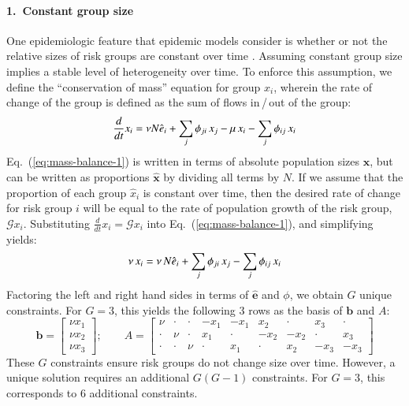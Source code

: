 \paragraph{1.~Constant group size}
\label{con:const-group}
One epidemiologic feature that epidemic models consider
is whether or not the relative sizes of risk groups are constant over time
\citep{Henry2015,Boily2015}.
Assuming constant group size implies a stable level of heterogeneity over time.
To enforce this assumption,
we define the ``conservation of mass'' equation for group $x_i$,
wherein the rate of change of the group
is defined as the sum of flows in\,/\,out of the group:
\begin{equation}\label{eq:mass-balance-1}
\frac{d}{dt}x_i
= \nu N \hat{e}_i + \sum_{j}{\phi_{ji} \thinspace x_j}
- \mu \thinspace x_i - \sum_{j}{\phi_{ij} \thinspace x_i}
\end{equation}
Eq.~(\ref{eq:mass-balance-1}) is written in terms of
absolute population sizes $\bm{x}$,
but can be written as proportions $\bm{\hat{x}}$
by dividing all terms by $N$.
If we assume that the proportion of each group $\hat{x}_i$ is constant over time,
then the desired rate of change for risk group $i$
will be equal to the rate of population growth of the risk group, $\mathcal{G} x_i$.
Substituting $\frac{d}{dt}x_i = \mathcal{G} x_i$
into Eq.~(\ref{eq:mass-balance-1}),
and simplifying yields:
\begin{equation}\label{eq:mass-balance-2}
\nu \thinspace x_i
= \nu \thinspace N \hat{e}_i + \sum_{j}{\phi_{ji} \thinspace x_j}
- \sum_{j}{\phi_{ij} \thinspace x_i}
\end{equation}
Factoring the left and right hand sides in terms of $\bm{\hat{e}}$ and $\phi$,
we obtain $G$ unique constraints.
For $G = 3$, this yields the following 3 rows as the basis of $\bm{b}$ and $A$:
\begin{equation}\label{eq:eg-basis}
\bm{b} = \left[\begin{array}{c}
\nu x_1 \\ \nu x_2 \\ \nu x_3
\end{array}\right];\qquad
A = \left[\begin{array}{ccccccccc}
	 \nu  & \cdot & \cdot & -x_1  & -x_1  &  x_2  & \cdot &  x_3  & \cdot \\
	\cdot &  \nu  & \cdot &  x_1  & \cdot & -x_2  & -x_2  & \cdot &  x_3  \\
	\cdot & \cdot &  \nu  & \cdot &  x_1  & \cdot &  x_2  & -x_3  & -x_3
\end{array}\right] 
\end{equation}
These $G$ constraints ensure risk groups do not change size over time.
However, a unique solution requires
an additional $G(G-1)$ constraints.
For $G = 3$, this corresponds to 6 additional constraints.

